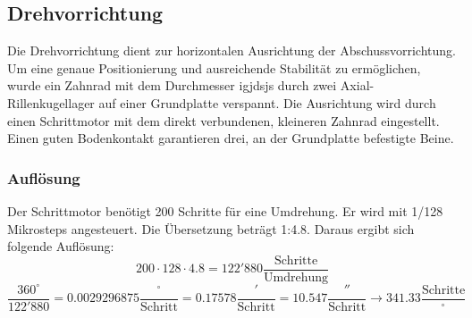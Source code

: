 \subsection{Drehvorrichtung}
Die Drehvorrichtung dient zur horizontalen Ausrichtung der 
Abschussvorrichtung. Um eine genaue Positionierung und ausreichende Stabilität zu ermöglichen, wurde ein Zahnrad mit dem Durchmesser igjdsjs durch zwei Axial-Rillenkugellager auf einer Grundplatte verspannt. Die Ausrichtung wird durch einen Schrittmotor mit dem direkt verbundenen, kleineren Zahnrad eingestellt. Einen guten Bodenkontakt garantieren drei, an der Grundplatte befestigte Beine.

\subsubsection{Auflösung}
Der Schrittmotor benötigt 200 Schritte für eine Umdrehung. Er wird mit 1/128 Mikrosteps angesteuert. Die Übersetzung beträgt 1:4.8. Daraus ergibt sich folgende Auflösung: 
\[ 200 \cdot 128 \cdot 4.8 = 122'880 \frac{\text{Schritte}}{\text{Umdrehung}}  \]
\[ \frac{360^\circ}{122'880} = 0.0029296875 \frac{^\circ}{\text{Schritt}} 
= 0.17578 \frac{'}{\text{Schritt}} = 10.547 \frac{''}{\text{Schritt}}
\rightarrow 341.33 \frac{\text{Schritte}}{^\circ}\]
